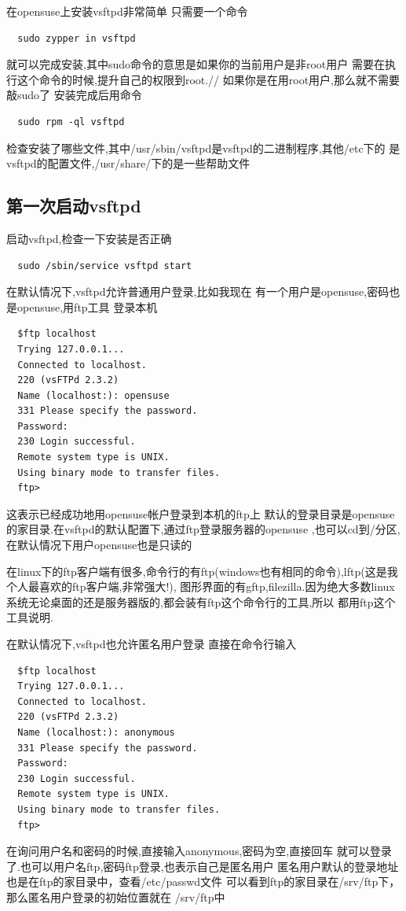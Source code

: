 \documentclass[adobefonts]{ctexart}
\begin{document}
在opensuse上安装vsftpd非常简单
只需要一个命令
\begin{verbatim}
  sudo zypper in vsftpd
\end{verbatim}
就可以完成安装,其中sudo命令的意思是如果你的当前用户是非root用户
需要在执行这个命令的时候,提升自己的权限到root.//
如果你是在用root用户,那么就不需要敲sudo了
安装完成后用命令
\begin{verbatim}
  sudo rpm -ql vsftpd
\end{verbatim}
检查安装了哪些文件,其中/usr/sbin/vsftpd是vsftpd的二进制程序,其他/etc下的
是vsftpd的配置文件,/usr/share/下的是一些帮助文件
\subsection{第一次启动vsftpd}
启动vsftpd,检查一下安装是否正确
\begin{verbatim}
  sudo /sbin/service vsftpd start
\end{verbatim}
在默认情况下,vsftpd允许普通用户登录,比如我现在
有一个用户是opensuse,密码也是opensuse,用ftp工具
登录本机
\begin{verbatim}
  $ftp localhost
  Trying 127.0.0.1...
  Connected to localhost.
  220 (vsFTPd 2.3.2)
  Name (localhost:): opensuse
  331 Please specify the password.
  Password:
  230 Login successful.
  Remote system type is UNIX.
  Using binary mode to transfer files.
  ftp> 
\end{verbatim}
这表示已经成功地用opensuse帐户登录到本机的ftp上
默认的登录目录是opensuse的家目录.在vsftpd的默认配置下,通过ftp登录服务器的opensuse
,也可以cd到/分区,在默认情况下用户opensuse也是只读的

在linux下的ftp客户端有很多,命令行的有ftp(windows也有相同的命令),lftp(这是我个人最喜欢的ftp客户端,非常强大!),
图形界面的有gftp,filezilla.因为绝大多数linux系统无论桌面的还是服务器版的,都会装有ftp这个命令行的工具,所以
都用ftp这个工具说明.

在默认情况下,vsftpd也允许匿名用户登录
直接在命令行输入
\begin{verbatim}
  $ftp localhost
  Trying 127.0.0.1...
  Connected to localhost.
  220 (vsFTPd 2.3.2)
  Name (localhost:): anonymous
  331 Please specify the password.
  Password:
  230 Login successful.
  Remote system type is UNIX.
  Using binary mode to transfer files.
  ftp> 
\end{verbatim}
在询问用户名和密码的时候,直接输入anonymous,密码为空,直接回车
就可以登录了.也可以用户名ftp,密码ftp登录,也表示自己是匿名用户
匿名用户默认的登录地址也是在ftp的家目录中，查看/etc/passwd文件
可以看到ftp的家目录在/srv/ftp下，那么匿名用户登录的初始位置就在
/srv/ftp中
\end{document}
